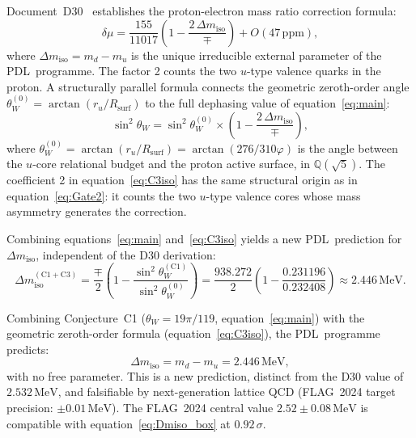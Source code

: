 \documentclass[12pt,a4paper]{article}
\theoremstyle{plain}
\theoremstyle{definition}
\theoremstyle{remark}
\newenvironment{prediction}[1][]{%
  \begin{tcolorbox}[predictionstyle,title={Falsifiable Prediction\ifx\relax#1\relax\else: #1\fi}]}{\end{tcolorbox}}
\newcommand{\PDL}{\textsc{PDL}}
\newcommand{\vp}{\varphi}
\newcommand{\Rsurf}{R_{\mathrm{surf}}}
\newcommand{\ru}{r_u}
\newcommand{\thetaW}{\theta_W}
\newcommand{\sinW}{\sin^2\!\thetaW}
\newcommand{\Dmiso}{\Delta m_{\mathrm{iso}}}
\begin{document}
Document~D30~\cite{PDL_D30} establishes the proton-electron mass ratio correction formula:
\begin{equation}
\delta\mu = \frac{155}{11017}\left(1 - \frac{2\,\Dmiso}{\mp}\right) + O(47\,\mathrm{ppm}),
\label{eq:Gate2}
\end{equation}
where $\Dmiso = m_d - m_u$ is the unique irreducible external parameter of the \PDL\ programme. The factor 2 counts the two $u$-type valence quarks in the proton. A structurally parallel formula connects the geometric zeroth-order angle $\thetaW^{(0)} = \arctan(\ru/\Rsurf)$ to the full dephasing value of equation~\eqref{eq:main}:
\begin{equation}
\sinW = \sin^2\!\thetaW^{(0)} \times \left(1 - \frac{2\,\Dmiso}{\mp}\right),
\label{eq:C3iso}
\end{equation}
where $\thetaW^{(0)} = \arctan(\ru/\Rsurf) = \arctan(276/310\vp)$ is the angle between the $u$-core relational budget and the proton active surface, in $\mathbb{Q}(\sqrt{5})$. The coefficient 2 in equation~\eqref{eq:C3iso} has the same structural origin as in equation~\eqref{eq:Gate2}: it counts the two $u$-type valence cores whose mass asymmetry generates the correction.

Combining equations~\eqref{eq:main} and~\eqref{eq:C3iso} yields a new \PDL\ prediction for $\Dmiso$, independent of the D30 derivation:
\begin{equation}
\Dmiso^{(\mathrm{C1+C3})} = \frac{\mp}{2}\left(1 - \frac{\sinW^{(\mathrm{C1})}}{\sin^2\!\thetaW^{(0)}}\right) = \frac{938.272}{2}\left(1 - \frac{0.231196}{0.232408}\right) \approx 2.446\,\mathrm{MeV}.
\label{eq:Dmiso_pred}
\end{equation}

\begin{prediction}[New prediction for $\Dmiso$]
Combining Conjecture~C1 ($\thetaW = 19\pi/119$, equation~\eqref{eq:main}) with the geometric zeroth-order formula (equation~\eqref{eq:C3iso}), the \PDL\ programme predicts:
\begin{equation}
\Dmiso = m_d - m_u = 2.446\,\mathrm{MeV},
\label{eq:Dmiso_box}
\end{equation}
with no free parameter. This is a new prediction, distinct from the D30 value of $2.532\,\mathrm{MeV}$, and falsifiable by next-generation lattice QCD (FLAG~2024 target precision: $\pm 0.01\,\mathrm{MeV}$). The FLAG~2024 central value $2.52 \pm 0.08\,\mathrm{MeV}$ is compatible with equation~\eqref{eq:Dmiso_box} at $0.92\,\sigma$.
\end{prediction}
\end{document}

